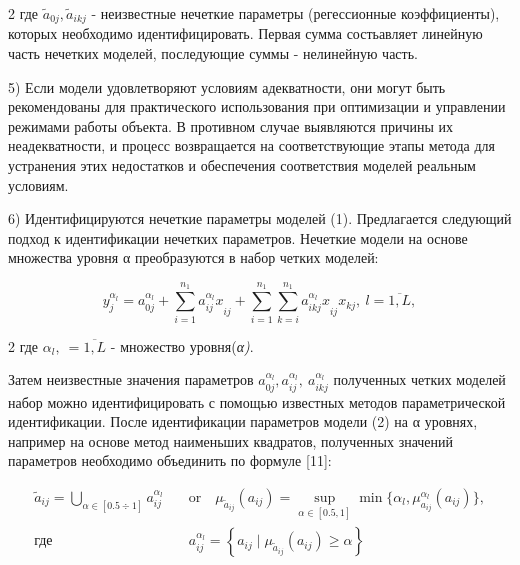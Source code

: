 \begin{multicols}{2}
где \({\widetilde{a}}_{0j},{\widetilde{a}}_{ikj}\) - неизвестные нечеткие
параметры (регессионные коэффициенты), которых необходимо
идентифицировать. Первая сумма состьавляет линейную часть нечетких
моделей, последующие суммы - нелинейную часть.

5) Если модели удовлетворяют условиям адекватности, они могут быть
рекомендованы для практического использования при оптимизации и
управлении режимами работы объекта. В противном случае выявляются
причины их неадекватности, и процесс возвращается на соответствующие
этапы метода для устранения этих недостатков и обеспечения соответствия
моделей реальным условиям.

6) Идентифицируются нечеткие параметры моделей (1). Предлагается
следующий подход к идентификации нечетких параметров. Нечеткие модели на
основе множества уровня α преобразуются в набор четких моделей:
\end{multicols}
\vspace{-0.5em}
\begin{equation}
y_{j}^{\alpha_{l}} = a_{0j}^{\alpha_{l}} + \sum_{i = 1}^{n_{1}}{{a_{ij}^{\alpha_{l}}x}_{ij} + \sum_{i = 1}^{n_{1}}{\sum_{k = i}^{n_{1}}{{a_{ikj}^{\alpha_{l}}x}_{ij}x_{kj}}}},\ l = \overline{1,L},
\end{equation}

\begin{multicols}{2}
где \(\alpha_{l}\mathbf{,\ } = \overline{1,L}\) - множество
уровня(\emph{α)}.

Затем неизвестные значения параметров
\(a_{0j}^{\alpha_{l}},a_{ij}^{\alpha_{l}},\ a_{ikj}^{\alpha_{l}}\) полученных
четких моделей набор можно идентифицировать с помощью известных методов
параметрической идентификации. После идентификации параметров модели (2)
на α уровнях, например на основе метод наименьших квадратов, полученных
значений параметров необходимо объединить по формуле {[}11{]}:
\end{multicols}
\vspace{-0.5em}
\begin{equation}
\begin{aligned}
{\widetilde{a}}_{ij} = \bigcup_{\alpha \in [0.5\div 1]} a_{ij}^{\alpha_{l}} \quad &\text{or} \quad \mu_{{\widetilde{a}}_{ij}}(a_{ij}) = \sup_{\alpha \in [0.5, 1]} \min \{ \alpha_{l}, \mu_{a_{ij}}^{\alpha_{l}}(a_{ij}) \}, \\
\text{где} \quad &a_{ij}^{\alpha_{l}} = \left\{ a_{ij} \mid \mu_{{\widetilde{a}}_{ij}}(a_{ij}) \geq \alpha \right\}
\end{aligned}
\end{equation}

